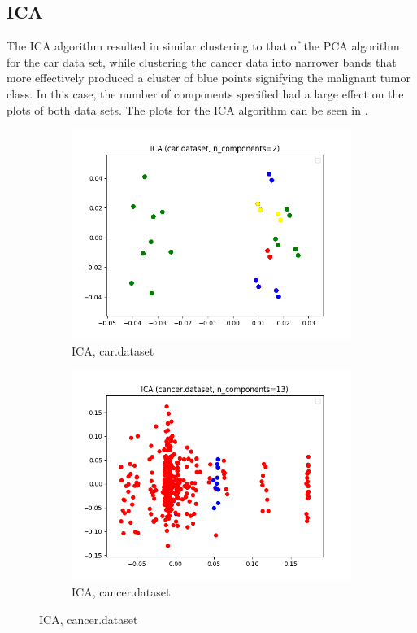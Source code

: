 \documentclass{article}
\begin{document}
    \subsection{ICA}
      The ICA algorithm resulted in similar clustering to that of the PCA algorithm for the car data set, while clustering the cancer data into narrower bands that more effectively produced a cluster of blue points signifying the malignant tumor class. In this case, the number of components specified had a large effect on the plots of both data sets. The plots for the ICA algorithm can be seen in .

      \begin{figure}[htb]
      \centering

        \begin{subfigure}{0.5\textwidth}
          \includegraphics[width=\linewidth]{out/ica/car-ica-comp-2.png}
          \caption{ICA, car.dataset}
          \label{fig:ica-plot-car}
        \end{subfigure}\hfil
        \begin{subfigure}{0.5\textwidth}
          \includegraphics[width=\linewidth]{out/ica/cancer-ica-comp-13.png}
          \caption{ICA, cancer.dataset}
          \label{fig:ica-plot-cancer}
        \end{subfigure}


\end{figure}
\end{document}
